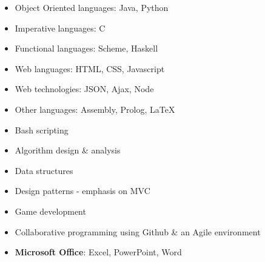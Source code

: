 \documentclass[]{friggeri-cv} %
\begin{document}
\begin{minipage}[t]{0.5\textwidth}
\begin{itemize}
\item{Object Oriented languages: Java, Python}
\item{Imperative languages: C}
\item{Functional languages: Scheme, Haskell}
\item{Web languages: HTML, CSS, Javascript}
\item{Web technologies: JSON, Ajax, Node}
\item{Other languages: Assembly, Prolog, \LaTeX}
\item{Bash scripting}
\end{itemize}
\end{minipage}
\begin{minipage}[t]{0.5\textwidth}
\begin{itemize}
\item{Algorithm design \& analysis}
\item{Data structures}
\item{Design patterns - emphasis on MVC}
\item{Game development}
\item{Collaborative programming using Github \& an Agile environment}
\item{\textbf{Microsoft Office}: Excel, PowerPoint, Word}
\end{itemize}
\end{minipage}
\vspace{0.4em}

\end{document}
